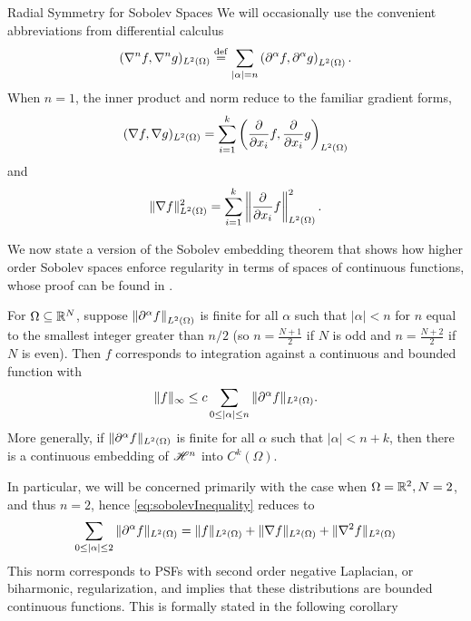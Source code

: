 \begin{chapter}{Radial Symmetry for Sobolev Spaces}
We will occasionally use the convenient abbreviations from differential calculus
\begin{equation}
  (\nabla^n f,\nabla^n g)_{L^2(\Omega)} \stackrel{\rm def}{=} \sum_{|\alpha|= n} \left(\partial^\alpha f,\partial^\alpha g\right)_{L^2(\Omega)}.
\end{equation}
When $n=1$, the inner product and norm reduce to the familiar gradient forms,
\begin{equation}
  (\nabla f,\nabla g)_{L^2(\Omega)} = \sum_{i=1}^k \left(\frac{\partial}{\partial x_i} f,\frac{\partial}{\partial x_i} g\right)_{L^2(\Omega)}
\end{equation}
and 
\begin{equation}
  \|\nabla f\|^2_{L^2(\Omega)} = \sum_{i=1}^k\left\| \frac{\partial}{\partial x_i}f\right\|^2_{L^2(\Omega)}.
\end{equation}

We now state a version of the Sobolev embedding theorem that shows how higher order Sobolev spaces enforce regularity in terms of spaces of continuous functions, whose proof can be found in \citep{strichartz2003guide}.
\begin{thm} \label{thm:sobolevInequality}
  For $\Omega \subseteq \mathbb R^N$, suppose $\left\|\partial^\alpha f\right\|_{L^2(\Omega)}$ is finite for all $\alpha$ such that $|\alpha| <n$ for $n$ equal to the smallest integer greater than $n/2$ (so $n=\frac{N+1}2$ if $N$ is odd and $n=\frac{N+2}2$ if $N$ is even). Then $f$ corresponds to integration against a continuous and bounded function with
  \begin{equation} \label{eq:sobolevInequality}
    \| f \|_\infty \le c \sum_{0\le |\alpha| \le n}\|\partial^\alpha f\|_{L^2(\Omega)}.
  \end{equation}
  More generally, if  $\|\partial^\alpha f\|_{L^2(\Omega)}$ is finite for all $\alpha$ such that $|\alpha| < n + k$, then there is a continuous embedding of $\mathscr H^n$ into $C^k(\Omega)$.
\end{thm}

In particular, we will be concerned primarily with the case when $\Omega = \mathbb R^2,N=2$, and thus $n=2$, hence \eqref{eq:sobolevInequality} reduces to
\begin{equation}
  \sum_{0\le |\alpha| \le 2}\|\del^\alpha f\|_{L^2(\Omega)} = \|f\|_{L^2(\Omega)} + \|\nabla f\|_{L^2(\Omega)}+ \|\nabla^2 f\|_{L^2(\Omega)} %
\end{equation}
This norm corresponds to PSFs with second order negative Laplacian, or biharmonic, regularization, and  implies that these distributions are bounded continuous functions.
This is formally stated in the following corollary


\end{chapter}
